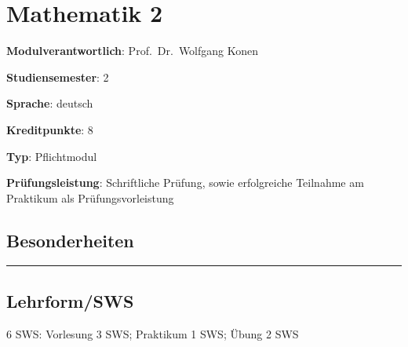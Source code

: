 \hypertarget{mathematik-2pathlabel....srcmodulbeschreibungen-bachelor-bpo5ba_mathematik2}{%
\chapter{Mathematik
2\label{../../src/modulbeschreibungen-bachelor-bpo5/BA_Mathematik2}}\label{mathematik-2pathlabel....srcmodulbeschreibungen-bachelor-bpo5ba_mathematik2}}

\begin{modulHead}
\textbf{Modulverantwortlich}: Prof.~Dr.~Wolfgang
Konen
\end{modulHead}
\begin{modulHead}
\textbf{Studiensemester}:
2
\end{modulHead}
\begin{modulHead}
\textbf{Sprache}:
deutsch
\end{modulHead}
\begin{modulHead}
\textbf{Kreditpunkte}:
8
\end{modulHead}
\begin{modulHead}
\textbf{Typ}:
Pflichtmodul
\end{modulHead}
\begin{modulHead}
\textbf{Prüfungsleistung}:
Schriftliche Prüfung, sowie erfolgreiche Teilnahme am Praktikum als
Prüfungsvorleistung
\end{modulHead}


\hypertarget{besonderheitenpathlabel....srcmodulbeschreibungen-bachelor-bpo5ba_mathematik2}{%
\section*{Besonderheiten\label{../../src/modulbeschreibungen-bachelor-bpo5/BA_Mathematik2}}\label{besonderheitenpathlabel....srcmodulbeschreibungen-bachelor-bpo5ba_mathematik2}}

\begin{center}\rule{0.5\linewidth}{0.5pt}\end{center}

\hypertarget{lehrformswspathlabel....srcmodulbeschreibungen-bachelor-bpo5ba_mathematik2}{%
\section*{Lehrform/SWS\label{../../src/modulbeschreibungen-bachelor-bpo5/BA_Mathematik2}}\label{lehrformswspathlabel....srcmodulbeschreibungen-bachelor-bpo5ba_mathematik2}}

6 SWS: Vorlesung 3 SWS; Praktikum 1 SWS; Übung 2 SWS

